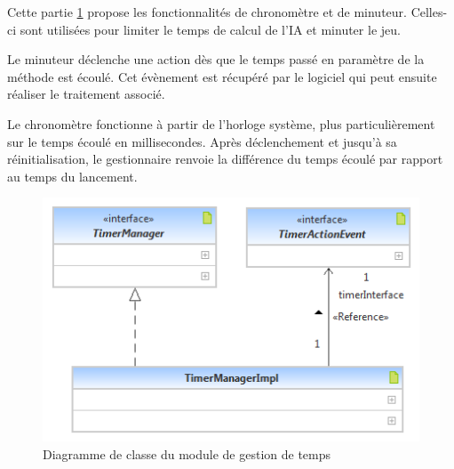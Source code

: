 Cette partie \ref{time} propose les fonctionnalités de chronomètre et de minuteur. Celles-ci sont utilisées pour limiter le temps de calcul de l'IA et minuter le jeu.

Le minuteur déclenche une action dès que le temps passé en paramètre de la méthode est écoulé. Cet évènement est récupéré par le logiciel qui peut ensuite réaliser le traitement associé.

Le chronomètre fonctionne à partir de l'horloge système, plus particulièrement sur le temps écoulé en millisecondes. Après déclenchement et jusqu'à sa réinitialisation, le gestionnaire renvoie la différence du temps écoulé par rapport au temps du lancement.

\begin{figure}[H]
\centering
\includegraphics[scale=0.85]{Architecture/PdpTimerLight.png}
\caption{Diagramme de classe du module de gestion de temps}
\label{time}
\end{figure}
